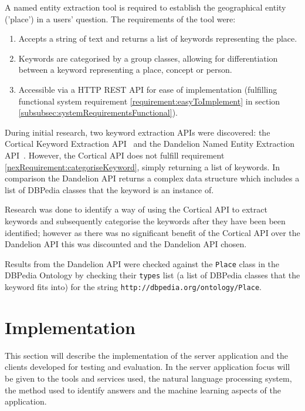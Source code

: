 \documentclass[authoryearcitations]{UoYCSproject}
\begin{document}
A named entity extraction tool is required to establish the geographical entity ('place') in a users' question. The requirements of the tool were:
\begin{enumerate}
  \item Accepts a string of text and returns a list of keywords representing the place.
  \item \label{nexRequirement:categoriseKeyword} Keywords are categorised by a group classes, allowing for differentiation between a keyword representing a place, concept or person.
  \item Accessible via a HTTP REST API for ease of implementation (fulfilling functional system requirement \ref{requirement:easyToImplement} in section \ref{subsubsec:systemRequirementsFunctional}).
\end{enumerate}

During initial research, two keyword extraction APIs were discovered: the Cortical Keyword Extraction API~\cite{serviceCorticalNex} and the Dandelion Named Entity Extraction API~\cite{serviceDandelionNex}. However, the Cortical API does not fulfill requirement \ref{nexRequirement:categoriseKeyword}, simply returning a list of keywords. In comparison the Dandelion API returns a complex data structure which includes a list of DBPedia classes that the keyword is an instance of.

Research was done to identify a way of using the Cortical API to extract keywords and subsequently categorise the keywords after they have been been identified; however as there was no significant benefit of the Cortical API over the Dandelion API this was discounted and the Dandelion API chosen.

Results from the Dandelion API were checked against the \texttt{Place} class in the DBPedia Ontology by checking their \texttt{types} list (a list of DBPedia classes that the keyword fits into) for the string \texttt{http://dbpedia.org/ontology/Place}.

\newpage
\chapter{Implementation}
\label{sec:implementation}
This section will describe the implementation of the server application and the clients developed for testing and evaluation. In the server application focus will be given to the tools and services used, the natural language processing system, the method used to identify answers and the machine learning aspects of the application.
\end{document}
